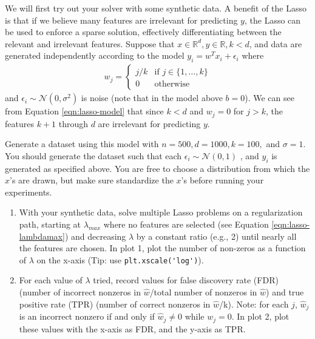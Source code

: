 \documentclass{article}
\begin{document}
\begin{sloppypar}
\begin{aprob}
    We will first try out your solver with some synthetic data.
    A benefit of the Lasso is that if we believe many features are irrelevant for predicting ${y}$, the Lasso can be used to enforce a sparse solution, effectively differentiating between the relevant and irrelevant features.
    Suppose that ${x} \in \mathbb{R}^d, y \in \mathbb{R}, k < d$, and data are generated independently according to the model $y_i = w^T x_i + \epsilon_i$ where
    \begin{align}
        w_j = \begin{cases} j/k & \text{if } j \in \{1,\dots,k\} \\
        0 & \text{otherwise}
        \end{cases}\label{eqn:lasso-model}
    \end{align} 
    and $\epsilon_i \sim \mathcal{N}(0, \sigma^2)$ is noise (note that in the model above $b=0$). We can see from Equation \eqref{eqn:lasso-model} that since $k < d$ and $w_j = 0$ for $j > k$, the features $k + 1$ through $d$ are irrelevant for predicting $y$.
    
    Generate a dataset using this model with $n = 500, d = 1000, k = 100,$ and $\sigma = 1$. You should generate the dataset such that each $\epsilon_i \sim \mathcal{N}(0, 1)$ , and $y_i$ is generated as specified above. You are free to choose a distribution from which the $x$'s are drawn, but make sure standardize the $x$'s before running your experiments.

    \begin{enumerate}
        \item {} With your synthetic data, solve multiple Lasso problems on a regularization path, starting at $\lambda_{max}$ where no features are selected (see Equation \eqref{eqn:lasso-lambdamax}) and decreasing $\lambda$ by a constant ratio (e.g., 2) until nearly all the features are chosen. 
        In plot 1, plot the number of non-zeros as a function of $\lambda$ on the x-axis (Tip: use \verb|plt.xscale('log')|).
        \item {} For each value of $\lambda$ tried, record values for false discovery rate (FDR) (number of incorrect nonzeros in $\widehat{w}$/total number of nonzeros in $\widehat{w}$) and true positive rate (TPR)
        (number of correct nonzeros in $\widehat{w}$/k). Note: for each $j$, $\widehat{w}_j$ is an incorrect nonzero if and only if $\widehat{w}_j \neq 0$ while $w_j = 0$.
        In plot 2, plot these values with the x-axis as FDR, and the y-axis as TPR.
          

\end{enumerate}
\end{aprob}
\end{sloppypar}
\end{document}
